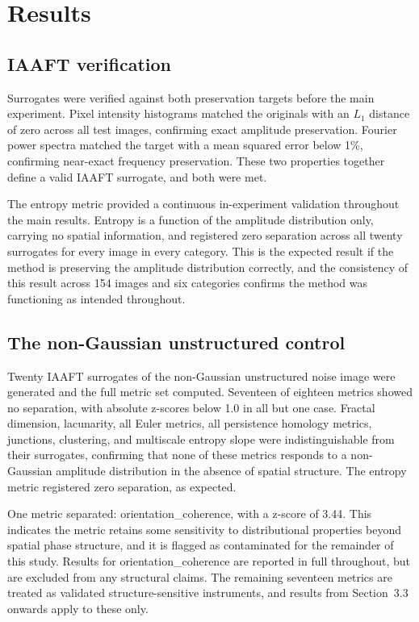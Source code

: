 \documentclass[a4paper,12pt]{article}
\begin{document}
\section{Results}

\subsection{IAAFT verification}

Surrogates were verified against both preservation targets before the main experiment. Pixel intensity histograms matched the originals with an $L_1$ distance of zero across all test images, confirming exact amplitude preservation. Fourier power spectra matched the target with a mean squared error below 1\%, confirming near-exact frequency preservation. These two properties together define a valid IAAFT surrogate, and both were met.

The entropy metric provided a continuous in-experiment validation throughout the main results. Entropy is a function of the amplitude distribution only, carrying no spatial information, and registered zero separation across all twenty surrogates for every image in every category. This is the expected result if the method is preserving the amplitude distribution correctly, and the consistency of this result across 154 images and six categories confirms the method was functioning as intended throughout.

\subsection{The non-Gaussian unstructured control}

Twenty IAAFT surrogates of the non-Gaussian unstructured noise image were generated and the full metric set computed. Seventeen of eighteen metrics showed no separation, with absolute z-scores below 1.0 in all but one case. Fractal dimension, lacunarity, all Euler metrics, all persistence homology metrics, junctions, clustering, and multiscale entropy slope were indistinguishable from their surrogates, confirming that none of these metrics responds to a non-Gaussian amplitude distribution in the absence of spatial structure. The entropy metric registered zero separation, as expected.

One metric separated: orientation\_coherence, with a z-score of 3.44. This indicates the metric retains some sensitivity to distributional properties beyond spatial phase structure, and it is flagged as contaminated for the remainder of this study. Results for orientation\_coherence are reported in full throughout, but are excluded from any structural claims. The remaining seventeen metrics are treated as validated structure-sensitive instruments, and results from Section~3.3 onwards apply to these only.
\end{document}
